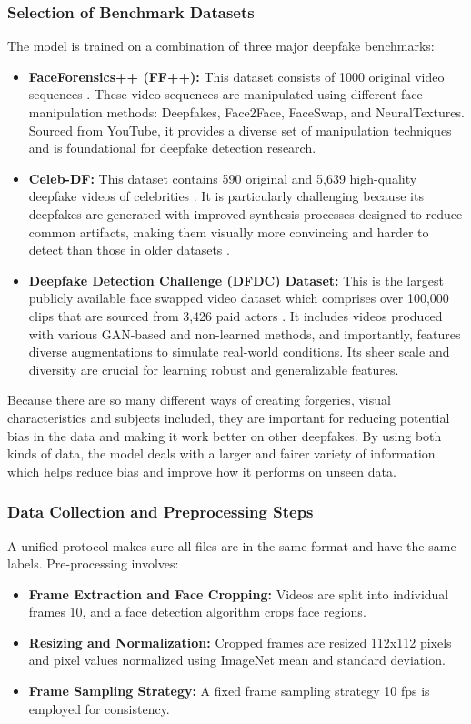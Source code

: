 \documentclass[conference]{IEEEtran}
\begin{document}
\subsubsection{Selection of Benchmark Datasets}
The model is trained on a combination of three major deepfake benchmarks:
\begin{itemize}
    \item \textbf{FaceForensics++ (FF++):} This dataset consists of 1000 original video sequences \cite{roessler2019faceforensicspp}. These video sequences are manipulated using different face manipulation methods: Deepfakes, Face2Face, FaceSwap, and NeuralTextures. Sourced from YouTube, it provides a diverse set of manipulation techniques and is foundational for deepfake detection research.
    \item \textbf{Celeb-DF:} This dataset contains 590 original and 5,639 high-quality deepfake videos of celebrities \cite{li2020celebdf}. It is particularly challenging because its deepfakes are generated with improved synthesis processes designed to reduce common artifacts, making them visually more convincing and harder to detect than those in older datasets .
    \item \textbf{Deepfake Detection Challenge (DFDC) Dataset:} This is the largest publicly available face swapped video dataset which comprises over 100,000 clips that are sourced from 3,426 paid actors \cite{dolhansky2020dfdc}. It includes videos produced with various GAN-based and non-learned methods, and importantly, features diverse augmentations to simulate real-world conditions. Its sheer scale and diversity are crucial for learning robust and generalizable features.
\end{itemize}
Because there are so many different ways of creating forgeries, visual characteristics and subjects included, they are important for reducing potential bias in the data and making it work better on other deepfakes. By using both kinds of data, the model deals with a larger and fairer variety of information which helps reduce bias and improve how it performs on unseen data.



\subsubsection{Data Collection and Preprocessing Steps}
A unified protocol makes sure all files are in the same format and have the same labels. Pre-processing involves:
\begin{itemize}
    \item \textbf{Frame Extraction and Face Cropping:} Videos are split into individual frames 10, and a face detection algorithm crops face regions.
    \item \textbf{Resizing and Normalization:} Cropped frames are resized 112x112 pixels and pixel values normalized using ImageNet mean and standard deviation.
    \item \textbf{Frame Sampling Strategy:} A fixed frame sampling strategy 10 fps is employed for consistency.
\end{itemize}
\end{document}
